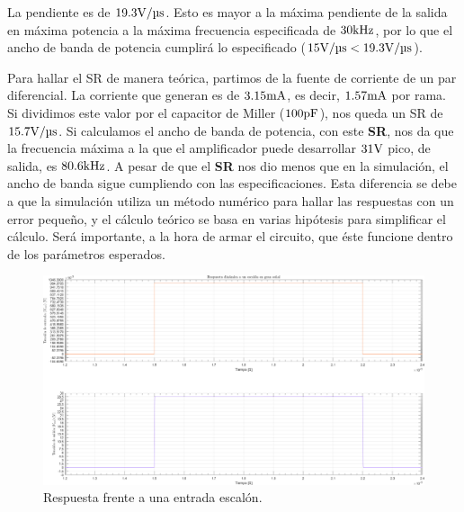 La pendiente es de $19.3 \si[per-mode=symbol]{\volt\per\micro\second}$. Esto es mayor a la máxima pendiente de la salida en máxima potencia a la máxima frecuencia especificada de $30 \si[per-mode=symbol]{\kilo\hertz}$, por lo que el ancho de banda de potencia cumplirá lo especificado ($15 \si[per-mode=symbol]{\volt\per\micro\second} < 19.3 \si[per-mode=symbol]{\volt\per\micro\second} $).

Para hallar el SR de manera teórica, partimos de la fuente de corriente de un par diferencial. La corriente que generan es de $3.15 \si[per-mode=symbol]{\milli\ampere}$, es decir, $1.57 \si[per-mode=symbol]{\milli\ampere}$ por rama. Si dividimos este valor por el capacitor de Miller ($100 \si[per-mode=symbol]{\pico\farad}$), nos queda un SR de $15.7 \si[per-mode=symbol]{\volt\per\micro\second}$. Si calculamos el ancho de banda de potencia, con este \textbf{SR}, nos da que la frecuencia máxima a la que el amplificador puede desarrollar $31 \si[per-mode=symbol]{\volt}$ pico, de salida, es $80.6 \si[per-mode=symbol]{\kilo\hertz}$. A pesar de que el \textbf{SR} nos dio menos que en la simulación, el ancho de banda sigue cumpliendo con las especificaciones. Esta diferencia se debe a que la simulación utiliza un método numérico para hallar las respuestas con un error pequeño, y el cálculo teórico se basa en varias hipótesis para simplificar el cálculo. Será importante, a la hora de armar el circuito, que éste funcione dentro de los parámetros esperados.

\clearpage

\begin{figure}[H]
	\centering
	\includegraphics[width=0.7\paperheight, angle=90]{img/sims/Slew_Rate.png}
	\caption{Respuesta frente a una entrada escalón.}
	\label{fig:slew}
\end{figure}

